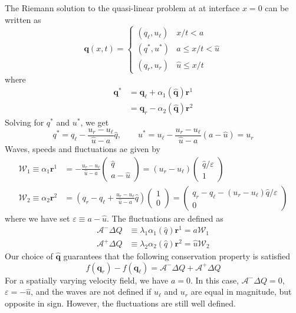 \documentclass{article}
\begin{document}
The Riemann solution to the quasi-linear problem at at interface $x=0$ can be written as 
\begin{equation}
\mathbf q(x,t) = \left\{\begin{array}{ll}
(q_\ell, u_\ell) &   x/t < a \\ 
(q^*, u^*)       &   a   \le x/t < \widehat{u} \\ 
(q_r, u_r)       &   \widehat{u} \le x/t
\end{array}
\right.
\end{equation}
where
\begin{align}
\mathbf q^* 
& = \mathbf q_\ell + \alpha_1(\widehat{\mathbf q}) {\mathbf r}^1 \\
& = \mathbf q_r - \alpha_2(\widehat{\mathbf q}) {\mathbf r}^2
\end{align}
Solving for $q^*$ and $u^*$, we get
\begin{equation}
q^*  = q_\ell - \frac{u_r - u_\ell}{\widehat{u}-a} \widehat{q}, \qquad
u^*  = u_\ell - \frac{u_r - u_\ell}{\widehat{u}-a} (a - \widehat{u}) = u_r
\end{equation}
Waves, speeds and fluctuations ae given by
\begin{align}
\mathcal W_1  \equiv \alpha_1 \mathbf r^1 & = - \frac{u_r - u_\ell}{\widehat{u}-a} 
\left(\begin{array}{c} \widehat{q} \\ a - \widehat{u}\end{array}\right) 
= (u_r - u_\ell)
\left(\begin{array}{c} \widehat{q}/\varepsilon \\ 
1 \end{array}\right) \\
\mathcal W_2  \equiv \alpha_2 \mathbf r^2 
& =  \left(q_r - q_\ell + \frac{u_r - u_\ell}{\widehat{u}-a}\widehat{q} \right)
\left(\begin{array}{c} 1 \\ 0\end{array}\right) 
= \left(\begin{array}{c} q_r - q_\ell - (u_r - u_\ell) \widehat{q}/\varepsilon \\ 
0 \end{array}\right)
\end{align}
where we have set $\varepsilon \equiv a - \widehat{u}$. 
The fluctuations are  defined as
\begin{align}
\mathcal A^- \Delta Q & \equiv \lambda_1 \alpha_1(\widehat{q}) \mathbf r^1 
= a \mathcal W_1 \\
\mathcal A^+ \Delta Q & \equiv \lambda_2 \alpha_2(\widehat{q}) \mathbf r^2 
= \widehat{u} \mathcal W_2
\end{align}
Our choice of $\widehat{\mathbf q}$ guarantees that the following conservation property is satisfied
\begin{equation}
f(\mathbf q_r) - f(\mathbf q_\ell) = \mathcal A^- \Delta Q + \mathcal A^+ \Delta Q
\end{equation}
For a spatially varying velocity field, we have $a = 0$.  In this case, $\mathcal A^- \Delta Q = 0$, $\varepsilon = -\widehat{u}$, and the waves are not defined if $u_\ell$ and $u_r$ are equal in magnitude, but opposite in sign. However, the fluctuations are still well defined.  
\end{document}
